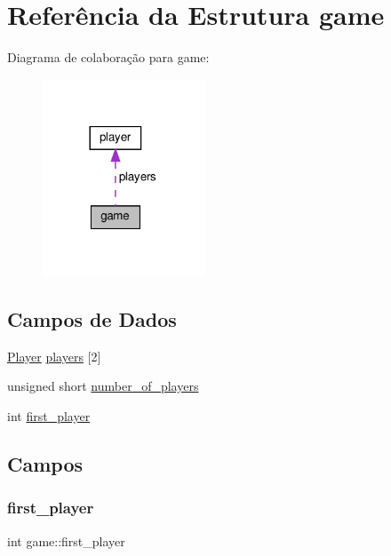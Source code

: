 \hypertarget{structgame}{}\section{Referência da Estrutura game}
\label{structgame}


Diagrama de colaboração para game\+:
\nopagebreak
\begin{figure}[H]
\begin{center}
\leavevmode
\includegraphics[width=137pt]{structgame__coll__graph}
\end{center}
\end{figure}
\subsection*{Campos de Dados}
\begin{DoxyCompactItemize}
\item 
\hyperlink{server_8h_a9c8780378078e51e7c9041cbac392db9}{Player} \hyperlink{structgame_a61d36a149f0d4d23b4ec8bff3a256d9f}{players} \mbox{[}2\mbox{]}
\item 
unsigned short \hyperlink{structgame_a92e543c2bad8ce842e762eb639b7ae66}{number\+\_\+of\+\_\+players}
\item 
int \hyperlink{structgame_aa1fa2aa40af4537744fa6b0a0ae4227c}{first\+\_\+player}
\end{DoxyCompactItemize}


\subsection{Campos}
\mbox{\label{structgame_aa1fa2aa40af4537744fa6b0a0ae4227c}} 
\subsubsection{\texorpdfstring{first\+\_\+player}{first\_player}}
{\footnotesize\ttfamily int game\+::first\+\_\+player}

